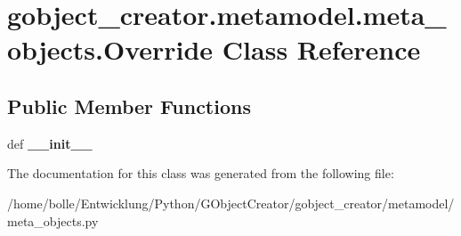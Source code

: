 \hypertarget{classgobject__creator_1_1metamodel_1_1meta__objects_1_1Override}{
\section{gobject\_\-creator.metamodel.meta\_\-objects.Override Class Reference}
\label{classgobject__creator_1_1metamodel_1_1meta__objects_1_1Override}
}
\subsection*{Public Member Functions}
\begin{DoxyCompactItemize}
\item 
\hypertarget{classgobject__creator_1_1metamodel_1_1meta__objects_1_1Override_a9efb0aa021405f555e29e56eac258dbc}{
def {\bfseries \_\-\_\-init\_\-\_\-}}
\label{classgobject__creator_1_1metamodel_1_1meta__objects_1_1Override_a9efb0aa021405f555e29e56eac258dbc}

\end{DoxyCompactItemize}


The documentation for this class was generated from the following file:\begin{DoxyCompactItemize}
\item 
/home/bolle/Entwicklung/Python/GObjectCreator/gobject\_\-creator/metamodel/meta\_\-objects.py\end{DoxyCompactItemize}
